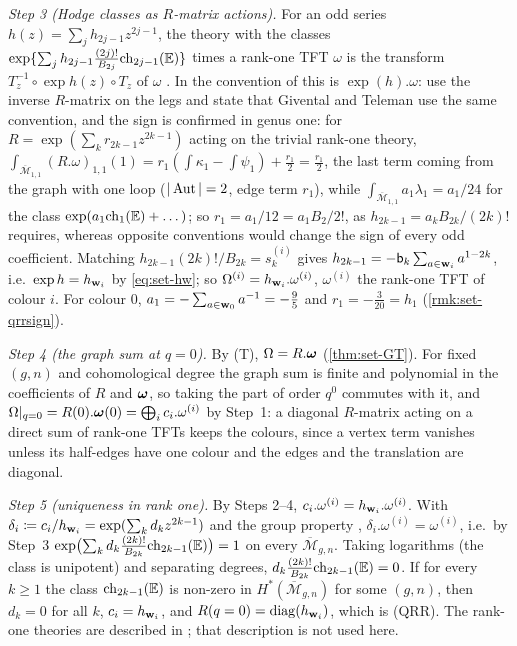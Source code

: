 \begin{rmk}
\emph{Step 3 (Hodge classes as $R$-matrix actions).} For an odd series $h(z)=\sum_jh_{2j-1}z^{2j-1}$, the theory with the classes $\exp\{\sum_jh_{2j-1}\frac{(2j)!}{B_{2j}}\mathrm{ch}_{2j-1}(\mathbb{E})\}$ times a rank-one TFT $\omega$ \cite[(8.6)]{MR2917177} is the transform $T_z^{-1}\circ\exp h(z)\circ T_z$ of $\omega$ \cite[8.7~Proposition~(i)]{MR2917177}. In the convention of \cite[Def.~2.13]{PPZ15} this is $\exp(h).\omega$: \cite[p.~20]{PPZ15} use the inverse $R$-matrix on the legs and state that Givental and Teleman use the same convention, and the sign is confirmed in genus one: for $R=\exp(\sum_kr_{2k-1}z^{2k-1})$ acting on the trivial rank-one theory, $\int_{\overline{\mathcal M}_{1,1}}(R.\omega)_{1,1}(1)=r_1(\int\kappa_1-\int\psi_1)+\frac{r_1}2=\frac{r_1}2$, the last term coming from the graph with one loop ($|\operatorname{Aut}|=2$, edge term $r_1$), while $\int_{\overline{\mathcal M}_{1,1}}a_1\lambda_1=a_1/24$ for the class $\exp(a_1\mathrm{ch}_1(\mathbb{E})+\dots)$; so $r_1=a_1/12=a_1B_2/2!$, as $h_{2k-1}=a_kB_{2k}/(2k)!$ requires, whereas opposite conventions would change the sign of every odd coefficient. Matching $h_{2k-1}(2k)!/B_{2k}=s^{(i)}_k$ gives $h_{2k-1}=-\mathsf{b}_k\sum_{a\in\mathbf{w}_i}a^{1-2k}$, i.e.\ $\exp h=h_{\mathbf{w}_i}$ by \eqref{eq:set-hw}; so $\Omega^{(i)}=h_{\mathbf{w}_i}.\omega^{(i)}$, $\omega^{(i)}$ the rank-one TFT of colour $i$. For colour $0$, $a_1=-\sum_{a\in\mathbf{w}_0}a^{-1}=-\frac95$ and $r_1=-\frac3{20}=h_1$ (\cref{rmk:set-qrrsign}).

\emph{Step 4 (the graph sum at $q=0$).} By (T), $\Omega=R.\boldsymbol{\omega}$ (\cref{thm:set-GT}). For fixed $(g,n)$ and cohomological degree the graph sum is finite and polynomial in the coefficients of $R$ and $\boldsymbol{\omega}$, so taking the part of order $q^0$ commutes with it, and $\Omega|_{q=0}=R(0).\boldsymbol{\omega}(0)=\bigoplus_ic_i.\omega^{(i)}$ by Step~1: a diagonal $R$-matrix acting on a direct sum of rank-one TFTs keeps the colours, since a vertex term vanishes unless its half-edges have one colour and the edges and the translation are diagonal.

\emph{Step 5 (uniqueness in rank one).} By Steps 2--4, $c_i.\omega^{(i)}=h_{\mathbf{w}_i}.\omega^{(i)}$. With $\delta_i\coloneqq c_i/h_{\mathbf{w}_i}=\exp(\sum_kd_kz^{2k-1})$ and the group property \cite[Prop.~2.14]{PPZ15}, $\delta_i.\omega^{(i)}=\omega^{(i)}$, i.e.\ by Step~3 $\exp\bigl(\sum_kd_k\frac{(2k)!}{B_{2k}}\mathrm{ch}_{2k-1}(\mathbb{E})\bigr)=1$ on every $\overline{\mathcal M}_{g,n}$. Taking logarithms (the class is unipotent) and separating degrees, $d_k\frac{(2k)!}{B_{2k}}\mathrm{ch}_{2k-1}(\mathbb{E})=0$. If for every $k\geq1$ the class $\mathrm{ch}_{2k-1}(\mathbb{E})$ is non-zero in $H^*(\overline{\mathcal M}_{g,n})$ for some $(g,n)$, then $d_k=0$ for all $k$, $c_i=h_{\mathbf{w}_i}$, and $R(q=0)=\operatorname{diag}(h_{\mathbf{w}_i})$, which is (QRR). The rank-one theories are described in \cite[8.10~Proposition]{MR2917177}; that description is not used here.
\end{rmk}


